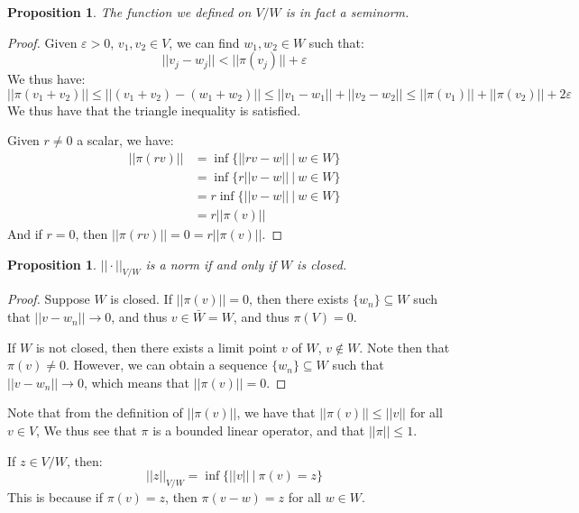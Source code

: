 \documentclass[a4paper,12pt]{report}
\newcommand{\varep}{ \varepsilon }
\newcommand{\sse} {\subseteq}
\newtheorem{prop}[theorem]{Proposition}
\newenvironment{remark}[1][Remark.]{\begin{trivlist}
\item[\hskip \labelsep {\bfseries #1}]}{\end{trivlist}}
\begin{document}
	\begin{prop}
	The function we defined on $V / W$ is in fact a seminorm. 
	\end{prop}
	\begin{proof}
	Given $\varep > 0$, $v_1, v_2 \in V$, we can find $w_1, w_2 \in W$ such that:
	\[ ||v_j - w_j|| < ||\pi(v_j)|| + \varep \]
	We thus have:
	\[ ||\pi(v_1 + v_2)|| \leq ||(v_1 + v_2) - (w_1 + w_2)|| \leq ||v_1 - w_1|| + ||v_2 - w_2|| \leq ||\pi(v_1)|| + ||\pi(v_2)|| + 2\varep \]
	We thus have that the triangle inequality is satisfied.
	
	Given $r \neq 0$ a scalar, we have:
	\begin{align*}
	||\pi(rv)|| &= \inf \bigg\{ ||rv - w|| ~\big|~ w \in W \bigg\} \\
	&= \inf \bigg\{ r ||v - w|| ~\big|~ w \in W \bigg\} \\
	&= r \inf \bigg\{ ||v - w|| ~\big|~ w \in W \bigg\} \\
	&= r ||\pi(v)||
	\end{align*}
	And if $r = 0$, then $||\pi(rv)|| = 0 = r ||\pi(v)||$. 
	\end{proof}
	
	\begin{prop}
	$||\cdot||_{V / W}$ is a norm if and only if $W$ is closed.
	\end{prop}
	\begin{proof}
	Suppose $W$ is closed. If $||\pi(v)|| = 0$, then there exists $\{w_n\} \sse W$ such that $||v - w_n|| \rightarrow 0$, and thus $v \in \bar{W} = W$, and thus $\pi(V) = 0$. 
	
	If $W$ is not closed, then there exists a limit point $v$ of $W$, $v \notin W$. Note then that $\pi(v) \neq 0$. However, we can obtain a sequence $\{w_n\} \sse W$ such that $||v - w_n|| \rightarrow 0$, which means that $||\pi(v)|| = 0$. 
	\end{proof}
	
	\begin{remark}
	Note that from the definition of $||\pi(v)||$, we have that $||\pi(v)|| \leq ||v||$ for all $v \in V$, We thus see that $\pi$ is a bounded linear operator, and that $||\pi|| \leq 1$.
	\end{remark}
	
	\begin{remark}
	If $z \in V / W$, then:
	\[ ||z||_{V/W} = \inf \bigg\{ ||v|| ~\big|~ \pi(v) = z \bigg\} \]
	This is because if $\pi(v) = z$, then $\pi(v - w) = z$ for all $w \in W$.
	\end{remark}
	
\end{document}
